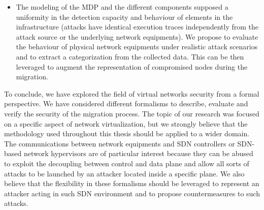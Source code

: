 \begin{itemize}
    \item 
    The modeling of the MDP and the different components supposed a uniformity in the detection capacity and behaviour of elements in the infrastructure (\eg attacks have identical execution traces independently from the attack source or the underlying network equipments). We propose to evaluate the behaviour of physical network equipments under realistic attack scenarios and to extract a categorization from the collected data. This can be then leveraged to augment the representation of compromised nodes during the migration.
\end{itemize}



To conclude, we have explored the field of virtual networks security from a formal perspective.
We have considered different formalisms to describe, evaluate and verify the security of the migration process. The topic of our research was focused on a specific aspect of network virtualization, but we strongly believe that the methodology used throughout this thesis should be applied to a wider domain.
The communications between network equipments and SDN controllers or SDN-based network hypervisors are of particular interest because they can be abused to exploit the decoupling between control and data plane and allow all sorts of attacks to be launched by an attacker located inside a specific plane.
We also believe that the flexibility in these formalisms should be leveraged to represent an attacker acting in such SDN environment and to propose countermeasures to such attacks.